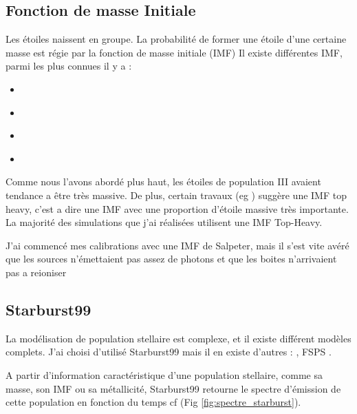


\subsection{Fonction de masse Initiale}

Les étoiles naissent en groupe.
La probabilité de former une étoile d'une certaine masse est régie par la fonction de masse initiale (IMF)
Il existe différentes \ac{IMF}, parmi les plus connues il y a :

\begin{itemize}
\item \cite{1955ApJ...121..161S}
\item \cite{1979ApJS...41..513M}
\item \cite{2001MNRAS.322..231K}
\item \cite{2003PASP..115..763C}
\end{itemize}

Comme nous l'avons abordé plus haut, les étoiles de population III avaient tendance a être très massive.
De plus, certain travaux (eg \cite{2003MNRAS.344L...7C} ) suggère une \ac{IMF} top heavy, c'est a dire une \ac{IMF} avec une proportion d'étoile massive très importante.
La majorité des simulations que j'ai réalisées utilisent une \ac{IMF} Top-Heavy.

J'ai commencé mes calibrations avec une \ac{IMF} de Salpeter, mais il s'est vite avéré que les sources n’émettaient pas assez de photons et que les boites n'arrivaient pas a reioniser


\subsection{Starburst99}


La modélisation de population stellaire est complexe, et il existe différent modèles complets.
J'ai choisi d'utilisé Starburst99 \citep{leitherer_starburst99:_1999} mais il en existe d'autres : \cite{2003MNRAS.344.1000B} , FSPS \cite{2009ApJ...699..486C}.  

A partir d'information caractéristique d'une population stellaire, comme sa masse, son \ac{IMF} ou sa métallicité, Starburst99 retourne le spectre d'émission de cette population en fonction du temps cf (Fig \ref{fig:spectre_starburst}).

